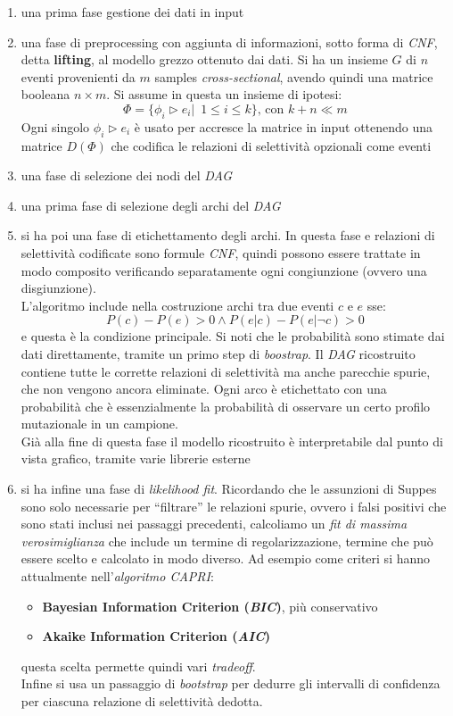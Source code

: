 \documentclass[a4paper,12pt, oneside]{book}
\begin{document}
\begin{enumerate}
  \item una prima fase gestione dei dati in input
  \item una fase di preprocessing con aggiunta di informazioni, sotto forma di
  \textit{CNF}, detta \textbf{lifting}, al modello grezzo 
  ottenuto dai dati. Si ha un insieme $G$ di $n$ eventi provenienti da $m$
  samples \textit{cross-sectional}, avendo quindi una matrice booleana $n\times
  m$. Si assume in questa un insieme di ipotesi:
  \[\Phi=\{\phi_i\triangleright e_i|\,\,\,1\leq i\leq k\}\mbox{, con }k+n\ll m\]
  Ogni singolo $\phi_i\triangleright e_i$ è usato per accresce la matrice in
  input ottenendo una matrice $D(\Phi)$ che codifica le relazioni di selettività
  opzionali come eventi
  \item una fase di selezione dei nodi del \textit{DAG}
  \item una prima fase di selezione degli archi del \textit{DAG}
  \item si ha poi una fase di etichettamento degli archi. In questa fase e
  relazioni di selettività codificate sono formule 
  \textit{CNF}, quindi possono essere trattate in modo composito verificando
  separatamente ogni congiunzione (ovvero una disgiunzione).\\
  L'algoritmo include nella costruzione archi tra due eventi $c$ e $e$ sse:
  \[P(c)-P(e)>0\land P(e|c)-P(e|\neg c)>0\]
  e questa è la condizione principale. Si noti che le probabilità sono stimate
  dai dati direttamente, tramite un primo step di \textit{boostrap}. Il
  \textit{DAG} ricostruito contiene tutte le corrette relazioni di selettività
  ma anche parecchie spurie, che non vengono ancora eliminate. Ogni arco è
  etichettato con una probabilità che è essenzialmente la probabilità di
  osservare un certo profilo mutazionale in un campione. \\
  Già alla fine di questa fase il modello ricostruito è interpretabile dal punto
  di vista grafico, tramite varie librerie esterne 
  \item si ha infine una fase di \textit{likelihood fit}. Ricordando che le
  assunzioni di Suppes sono solo necessarie per ``filtrare'' le relazioni
  spurie, ovvero i falsi positivi che sono stati inclusi nei passaggi
  precedenti, calcoliamo un \textit{fit di massima verosimiglianza} che include
  un termine di regolarizzazione, termine che può essere scelto e calcolato in
  modo diverso. Ad esempio come criteri si hanno attualmente
  nell'\textit{algoritmo CAPRI}: 
  \begin{itemize}
    \item \textbf{Bayesian Information Criterion (\textit{BIC})}, più
    conservativo
    \item \textbf{Akaike Information Criterion (\textit{AIC})}
  \end{itemize}
  questa scelta permette quindi vari \textit{tradeoff}.\\
  Infine si usa un passaggio di \textit{bootstrap} per dedurre gli intervalli
  di confidenza per ciascuna relazione di selettività dedotta. 
\end{enumerate}
\end{document}
